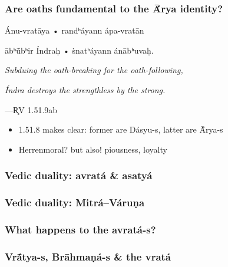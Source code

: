 \documentclass[pdf]{beamer}
\begin{document}
\begin{frame} \frametitle{Are oaths fundamental to the Ā́rya identity?}
\begin{center}
	Ánu-vratāya • randʰáyann ápa-vratān

	ābʰū́bʰir Índraḥ • ṡnatʰáyann ánābʰuvaḥ.

	\vspace{12pt}

	\textit{Subduing the oath-breaking for the oath-following,}

	\textit{Índra destroys the strengthless by the strong.}

	\vspace{12pt}

 	---R̥V 1.51.9ab
\end{center}

\begin{itemize}
	\item 1.51.8 makes clear: former are Dásyu-s, latter are Ā́rya-s
	\item Herrenmoral? but also! piousness, loyalty
\end{itemize}
\end{frame}



\begin{frame} \frametitle{Vedic duality: avratá \& asatyá}
\end{frame}

\begin{frame} \frametitle{Vedic duality: Mitrá--Váruṇa}
\end{frame}

\begin{frame} \frametitle{What happens to the avratá-s?}
\end{frame}

\begin{frame} \frametitle{Vrā́tya-s, Brāhmaṇá-s \& the vratá}
\end{frame}

\end{document}
